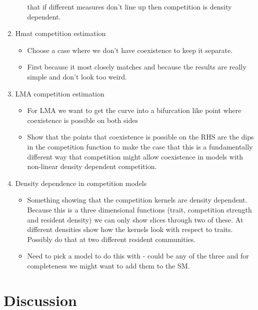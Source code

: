 \documentclass[a4paper,11pt]{article}
\begin{document}
\begin{enumerate}
\begin{itemize}
    that if different measures don't line up then competition is
    density dependent.
  \end{itemize}
\item Hmat competition estimation
  \begin{itemize}
  \item Choose a case where we don't have coexistence to keep it
    separate.
  \item First because it most closely matches \citet{Kisdi-1999} and
    because the results are really simple and don't look too weird.
  \end{itemize}
\item LMA competition estimation
  \begin{itemize}
  \item For LMA we want to get the curve into a bifurcation like point
    where coexistence is possible on both sides
  \item Show that the points that coexistence is possible on the RHS
    are the dips in the competition function to make the case that
    this is a fundamentally different way that competition might allow
    coexistence in models with non-linear density dependent
    competition.
  \end{itemize}
\item Density dependence in competition models
  \begin{itemize}
  \item Something showing that the competition kernels are density
    dependent.  Because this is a three dimensional functions (trait,
    competition strength and resident density) we can only show slices
    through two of these.  At different densities show how the
    kernels look with respect to traits.  Possibly do that at two
    different resident communities.
  \item Need to pick a model to do this with - could be any of the
    three and for completeness we might want to add them to the SM.
  \end{itemize}
\end{enumerate}

\clearpage
\section{Discussion}
\end{document}
